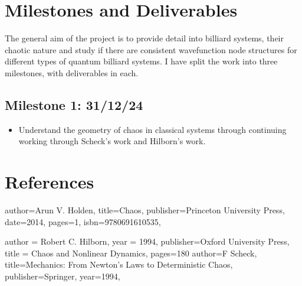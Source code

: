 \documentclass[12pt,a4paper]{amsart}
\begin{document}
\newpage

\section{Milestones and Deliverables}

The general aim of the project is to provide detail into billiard systems, their chaotic nature and study if there are consistent wavefunction node structures for different types of quantum billiard systems. I have split the work into three milestones, with deliverables in each.

\subsection*{Milestone 1: 31/12/24}
\begin{itemize}
    \item Understand the geometry of chaos in classical systems through continuing working through Scheck's work and Hilborn's work.
\end{itemize}






\section*{References} 
\begin{biblist}
    {
      author={Arun V. Holden},
      title={Chaos},
      publisher={Princeton University Press},
      date={2014},
      pages={1},
      isbn={9780691610535},
    }
    
        {
        author = {Robert C. Hilborn},
        year = {1994},
        publisher={Oxford University Press},
        title = {Chaos and Nonlinear Dynamics},
        pages={180}
        }
        {
        author={F Scheck},
        title={Mechanics: From Newton's Laws to Deterministic Chaos},
        publisher={Springer},
        year={1994}, 
        }

\end{biblist}
\end{document}
